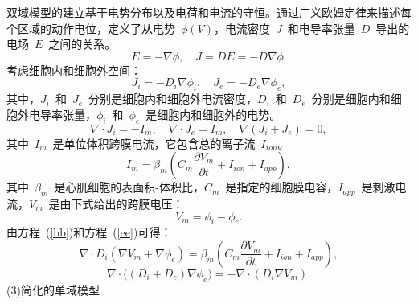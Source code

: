 \documentclass[twoside,UTF8]{nputhesis}
\begin{document}
双域模型的建立基于电势分布以及电荷和电流的守恒。通过广义欧姆定律来描述每个区域的动作电位，定义了从电势~$\phi(V)$，电流密度~$J$~和电导率张量~$D$~导出的电场~$E$~之间的关系。
\begin{equation}
E=-\nabla\phi,\quad J=DE=-D\nabla\phi.
\label{aa}
\end{equation}
考虑细胞内和细胞外空间：
\begin{equation}
J_i=-D_i\nabla\phi_i,\quad J_e=-D_e\nabla\phi_e,
\label{bb}
\end{equation}
其中，$J_i$~和~$J_e$~分别是细胞内和细胞外电流密度，$D_i$~和~$D_e$~分别是细胞内和细胞外电导率张量，$\phi_i$~和~$\phi_e$~是细胞内和细胞外的电势。
\begin{equation}
\nabla\cdot J_i=-I_m,\quad \nabla\cdot J_e=I_m, \quad\nabla(J_i+J_e)=0,
\label{cc}
\end{equation}
其中~$I_m$~是单位体积跨膜电流，它包含总的离子流~$I_{ion}$。
\begin{equation}
I_m=\beta_m\left(C_m\frac{\partial V_m}{\partial t}+I_{ion}+I_{app}\right),
\label{dd}
\end{equation}
其中~$\beta_m$~是心肌细胞的表面积-体积比，$C_m$~是指定的细胞膜电容，$I_{app}$~是刺激电流，$V_m$~是由下式给出的跨膜电压：
\begin{equation}
V_m=\phi_i-\phi_e.
\label{ee}
\end{equation}
由方程~(\ref{bb})和方程~(\ref{ee})可得：
\begin{equation}
\nabla\cdot D_i(\nabla V_m+\nabla\phi_e)=\beta_m\left(C_m\frac{\partial V_m}{\partial t}+I_{ion}+I_{app}\right),
\label{ff}
\end{equation}
\begin{equation}
\nabla\cdot\Big((D_i+D_e)\nabla\phi_e\Big)=-\nabla\cdot(D_i\nabla V_m).
\label{gg}
\end{equation}
(3)简化的单域模型
\end{document}
